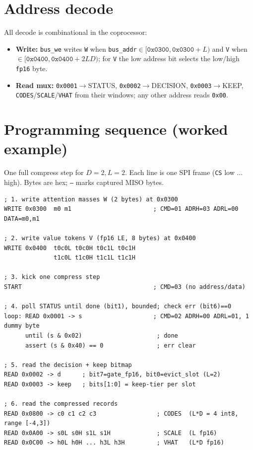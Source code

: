 \documentclass[11pt]{article}
\newcommand{\reg}[1]{\texttt{#1}}
\newcommand{\hx}[1]{\texttt{0x#1}}
\begin{document}
\section{Address decode}
All decode is combinational in the coprocessor:
\begin{itemize}\setlength\itemsep{1pt}
\item \textbf{Write:} \reg{bus\_we} writes \reg{W} when
\reg{bus\_addr}$\in[\hx{0300},\hx{0300}{+}L)$ and \reg{V} when
$\in[\hx{0400},\hx{0400}{+}2LD)$; for \reg{V} the low address bit selects the
low/high \reg{fp16} byte.
\item \textbf{Read mux:} \hx{0001}$\to$STATUS, \hx{0002}$\to$DECISION,
\hx{0003}$\to$KEEP, \reg{CODES}/\reg{SCALE}/\reg{VHAT} from their windows; any
other address reads \hx{00}.
\end{itemize}

\section{Programming sequence (worked example)}
One full compress step for $D{=}2,L{=}2$. Each line is one SPI frame
(\reg{CS} low $\ldots$ high). Bytes are hex; \reg{--} marks captured MISO bytes.

\begin{lstlisting}
; 1. write attention masses W (2 bytes) at 0x0300
WRITE 0x0300  m0 m1                       ; CMD=01 ADRH=03 ADRL=00 DATA=m0,m1

; 2. write value tokens V (fp16 LE, 8 bytes) at 0x0400
WRITE 0x0400  t0c0L t0c0H t0c1L t0c1H
              t1c0L t1c0H t1c1L t1c1H

; 3. kick one compress step
START                                     ; CMD=03 (no address/data)

; 4. poll STATUS until done (bit1), bounded; check err (bit6)==0
loop: READ 0x0001 -> s                    ; CMD=02 ADRH=00 ADRL=01, 1 dummy byte
      until (s & 0x02)                     ; done
      assert (s & 0x40) == 0               ; err clear

; 5. read the decision + keep bitmap
READ 0x0002 -> d      ; bit7=gate_fp16, bit0=evict_slot (L=2)
READ 0x0003 -> keep   ; bits[1:0] = keep-tier per slot

; 6. read the compressed records
READ 0x0800 -> c0 c1 c2 c3                 ; CODES  (L*D = 4 int8, range [-4,3])
READ 0x0A00 -> s0L s0H s1L s1H             ; SCALE  (L fp16)
READ 0x0C00 -> h0L h0H ... h3L h3H         ; VHAT   (L*D fp16)
\end{lstlisting}
\end{document}
